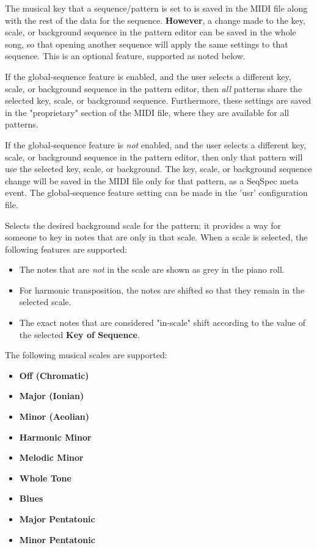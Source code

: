    The musical key that a sequence/pattern is set to is
   saved in the MIDI file along with the rest of the data for the sequence.
   \textbf{However},
   a change made to the key, scale, or background sequence in
   the pattern editor can be saved in the whole song,
   so that opening another sequence
   will apply the same settings to that sequence.  This is an optional feature,
   supported as noted below.

   If the global-sequence feature is enabled, and the user selects
   a different key, scale, or background sequence in the pattern editor, 
   then \textsl{all} patterns share the selected key, scale, or background
   sequence.  Furthermore, these settings are saved in the "proprietary"
   section of the MIDI file, where they are available for all patterns.

   If the global-sequence feature is \textsl{not} enabled, and the user selects
   a different key, scale, or background sequence in the pattern editor, 
   then only that pattern will use the selected key, scale, or background.
   The key, scale, or background sequence change will be saved in the MIDI file
   only for that pattern, as a SeqSpec meta event.
   The global-sequence feature setting can be made in the 'usr' configuration
   file.

   Selects the desired background scale for the pattern; it provides a way for
   someone to key in notes that are only in that scale.
   When a scale is selected, the following features are supported:

   \begin{itemize}
      \item The notes that are \textsl{not}
         in the scale are shown as grey in the piano roll.
      \item For harmonic transposition, the notes are shifted
         so that they remain in the selected scale.
      \item The exact notes that are considered "in-scale" shift according
         to the value of the selected \textbf{Key of Sequence}.
   \end{itemize}

   The following musical scales are supported:

   \begin{itemize}
      \item \textbf{Off (Chromatic)}
      \item \textbf{Major (Ionian)}
      \item \textbf{Minor (Aeolian)}
      \item \textbf{Harmonic Minor}
      \item \textbf{Melodic Minor}
      \item \textbf{Whole Tone}
      \item \textbf{Blues}
      \item \textbf{Major Pentatonic}
      \item \textbf{Minor Pentatonic}
   \end{itemize}


